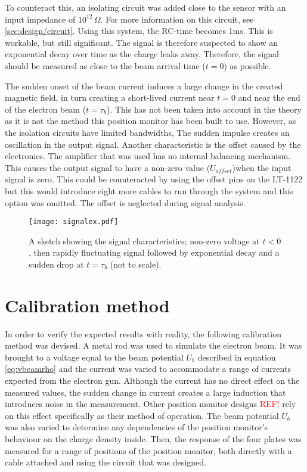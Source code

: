 To counteract this, an isolating circuit was added close to the sensor with an input impedance of $10^{12}\,\Omega$. For more information on this circuit, see \ref{sec:design/circuit}. Using this system, the RC-time becomes 1ms. This is workable, but still significant. The signal is therefore suspected to show an exponential decay over time as the charge leaks away. Therefore, the signal should be measured as close to the beam arrival time ($t=0$) as possible.

The sudden onset of the beam current induces a large change in the created magnetic field, in turn creating a short-lived current near $t=0$ and near the end of the electron beam ($t=\tau_b$). This has not been taken into account in the theory as it is not the method this position monitor has been built to use. However, as the isolation circuits have limited bandwidths, The sudden impulse creates an oscillation in the output signal.
Another characteristic is the offset caused by the electronics. The amplifier that was used has no internal balancing mechanism. This causes the output signal to have a non-zero value ($U_{offset}$)when the input signal is zero. This could be counteracted by using the offset pins on the LT-1122 \cite{LT1122} but this would introduce eight more cables to run through the system and this option was omitted. The offset is neglected during signal analysis.

\begin{figure}[H]
\centering
%
\texttt{[image: signalex.pdf]}
\caption{A sketch showing the signal characteristics; non-zero voltage at $t<0$, then rapidly fluctuating signal followed by exponential decay and a sudden drop at $t=\tau_b$ (not to scale).}
\label{fig:signalex}
\end{figure}

\section{Calibration method}
In order to verify the expected results with reality, the following calibration method was devised. 
A metal rod was used to simulate the electron beam. It was brought to a voltage equal to the beam potential $U_b$ described in equation \ref{eq:vbeamrho} and the current was varied to accommodate a range of currents expected from the electron gun. Although the current has no direct effect on the measured values, the sudden change in current creates a large induction that introduces noise in the measurement. Other position monitor designs \textcolor{red}{REF!} rely on this effect specifically as their method of operation. 
The beam potential $U_b$ was also varied to determine any dependencies of the position monitor's behaviour on the charge density inside. Then, the response of the four plates was measured for a range of positions of the position monitor, both directly with a cable attached and using the circuit that was designed.

